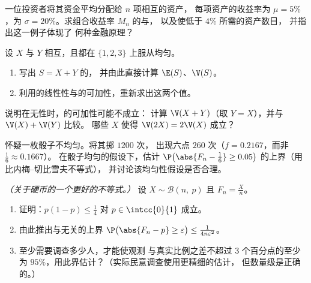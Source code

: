 \begin{exercise}[$\star\star$]\label{exo:g12:sums:4}
一位投资者将其资金平均分配给 $n$ 项相互的资产，
每项资产的收益率为 $\mu = 5\%$，为
$\sigma = 20\%$。求组合收益率 $M_n$ 的与，
以及使低于 $4\%$ 所需的资产数目，
并指出这一例子体现了
何种金融原理？
\end{exercise}

\begin{exercise}[$\star\star$]\label{exo:g12:sums:5}
设 $X$ 与 $Y$ 相互，且都在 $\{1, 2, 3\}$ 上服从均匀。
\begin{enumerate}
  \item 写出 $S = X + Y$ 的，
        并由此直接计算 $\E(S)$、$\V(S)$。
  \item 利用的线性性与的可加性，重新求出这两个值。
\end{enumerate}
\end{exercise}

\begin{exercise}[$\star\star$]\label{exo:g12:sums:6}
说明在无性时，的可加性可能不成立：
计算 $\V(X + Y)$（取 $Y = X$），并与 $\V(X) + \V(Y)$ 比较。
哪些 $X$ 使得 $\V(2X) = 2\V(X)$ 成立？
\end{exercise}

\begin{exercise}[$\star\star$]\label{exo:g12:sums:7}
怀疑一枚骰子不均匀。将其掷 $1200$ 次，
出现六点 $260$ 次（$f = 0.2167$，而非 $\frac16 \approx 0.1667$）。
在骰子均匀的假设下，估计
$\P\bigl(\abs{F_n - \frac16} \geq 0.05\bigr)$ 的上界（用比内梅–切比雪夫不等式），
并讨论该均匀性假设是否合理。
\end{exercise}

\begin{exercise}[$\star\star\star$]\label{exo:g12:sums:8}
\emph{（关于硬币的一个更好的不等式。）}
设 $X \sim \mathcal B(n,\ p)$ 且 $F_n = \frac Xn$。
\begin{enumerate}
  \item 证明：$p(1-p) \leq \frac14$ 对 $p \in \intcc{0}{1}$ 成立。
  \item 由此推出与无关的上界
        $\P\bigl(\abs{F_n - p} \geq \varepsilon\bigr) \leq
        \frac{1}{4n\varepsilon^2}$。
  \item 至少需要调查多少人，才能使观测
        与真实比例之差不超过 $3$ 个百分点的至少为
        $95\%$，用此界估计？（实际民意调查使用更精细的估计，
        但数量级是正确的。）
\end{enumerate}
\end{exercise}

